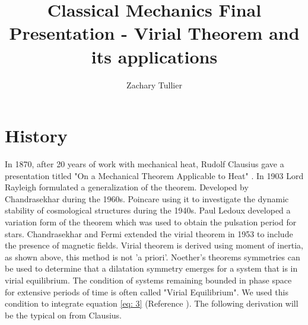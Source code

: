 \documentclass[12pt]{article}
\begin{document}
\singlespacing  %
\title{Classical Mechanics Final Presentation - Virial Theorem and its applications}

\author[1]{Zachary Tullier}

\maketitle

\section{History}
    In 1870, after 20 years of work with mechanical heat, Rudolf Clausius gave a presentation titled "On a Mechanical Theorem Applicable to Heat" \cite{doi:10.1080/14786447008640370}. In 1903 Lord Rayleigh formulated a generalization of the theorem. Developed by Chandrasekhar during the 1960s. Poincare using it to investigate the dynamic stability of cosmological structures during the 1940s. Paul Ledoux developed a variation form of the theorem which was used to obtain the pulsation period for stars. Chandrasekhar and Fermi extended the virial theorem in 1953 to include the presence of magnetic fields.
    Virial theorem is derived using moment of inertia, as shown above, this method is not 'a priori'. Noether's theorems symmetries can be used to determine that a dilatation symmetry emerges for a system that is in virial equilibrium. 
    The condition of systems remaining bounded in phase space for extensive periods of time is often called "Virial Equilibrium". We used this condition to integrate equation \ref{eq: 3} (Reference \cite{Medium_Virial}). The following derivation will be the typical on from Clausius.
\end{document}
